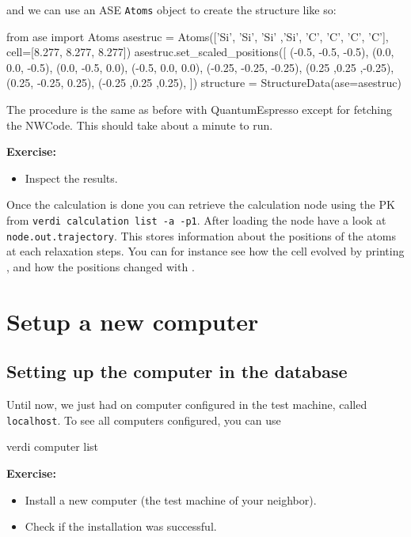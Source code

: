 and we can use an ASE \texttt{Atoms} object to create the structure like so:

\begin{pythoncommand}
from ase import Atoms
asestruc = Atoms(['Si', 'Si', 'Si' ,'Si', 'C', 'C', 'C', 'C'],
    cell=[8.277, 8.277, 8.277])
asestruc.set_scaled_positions([
    (-0.5, -0.5, -0.5),
    (0.0, 0.0, -0.5),
    (0.0, -0.5, 0.0),
    (-0.5, 0.0, 0.0),
    (-0.25, -0.25, -0.25),
    (0.25 ,0.25 ,-0.25),
    (0.25, -0.25, 0.25),
    (-0.25 ,0.25 ,0.25),
])
structure = StructureData(ase=asestruc)
\end{pythoncommand}

The procedure is the same as before with QuantumEspresso except for fetching the NWCode.  This should take about a minute to run.

\begin{tcolorbox}
\textbf{Exercise:}
\begin{itemize}
\item Inspect the results.
\end{itemize}
\end{tcolorbox}

Once the calculation is done you can retrieve the calculation node using the PK from \texttt{verdi calculation list -a -p1}.  After loading the node have a look at \texttt{node.out.trajectory}.  This stores information about the positions of the atoms at each relaxation steps.  You can for instance see how the cell evolved by printing
, and how the positions changed with 
.


\section{\label{sec:computersetuptask}Setup a new computer}
\subsection{Setting up the computer in the database}
Until now, we just had on computer configured in the test machine, called \texttt{localhost}. To see all computers configured, you can use
\begin{bashcommand}
verdi computer list
\end{bashcommand}

\begin{tcolorbox}
\textbf{Exercise:}
\begin{itemize}
\item Install a new computer (the test machine of your neighbor).
\item Check if the installation was successful.
\end{itemize}
\end{tcolorbox}

